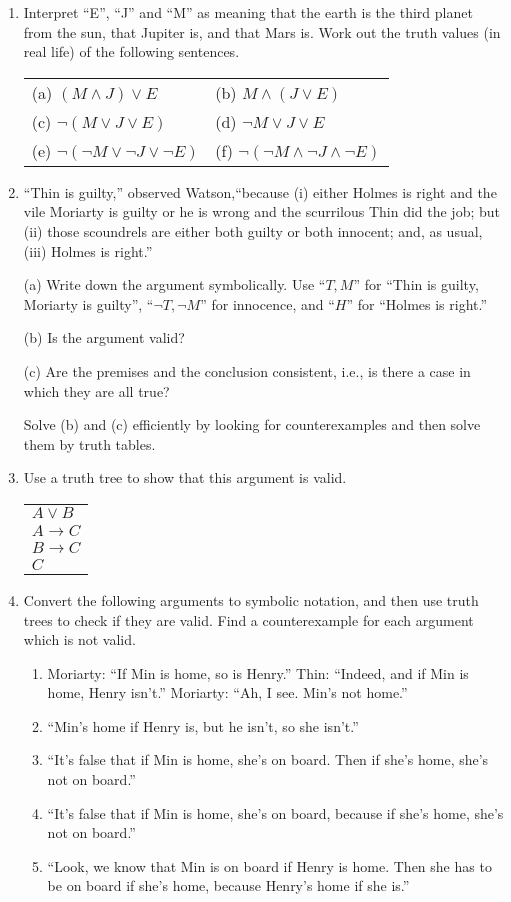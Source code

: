 \documentclass[letterpaper, 11pt]{article}
\theoremstyle{definition}
\begin{document}
\begin{enumerate}
 \item Interpret ``E'', ``J'' and ``M'' as meaning that the earth is the third planet from the sun, that Jupiter is, and that Mars is. Work out the truth values (in real life) of the following sentences.

\begin{tabular}{ll}
(a) $(M\wedge J) \vee E$	& (b) $M\wedge (J \vee E)$ \\
(c) $\neg(M \vee J \vee E)$	& (d) $\neg M \vee J \vee E$ \\
(e) $\neg(\neg M \vee \neg J \vee \neg E)$ & (f) $\neg(\neg M \wedge \neg J \wedge \neg E)$
\end{tabular}

\item ``Thin is guilty,'' observed Watson,``because (i) either Holmes is right and the vile Moriarty is guilty or he is wrong and the scurrilous Thin did the job; but (ii) those scoundrels are either both guilty or both innocent; and, as usual, (iii) Holmes is right.''

(a) Write down the argument symbolically. Use ``$T, M$'' for ``Thin is guilty, Moriarty is guilty'', ``$\neg T,\neg M$'' for innocence, and ``$H$'' for ``Holmes is right.''

(b) Is the argument valid? 
 
(c) Are the premises and the conclusion consistent, i.e., is there a case in which they are all true?

 Solve (b) and (c) efficiently by looking for counterexamples and then solve them by truth tables.

\item \parbox{3.5in}{Use a truth tree to show that this argument is valid.}\quad
\begin{tabular}{l}
$A\vee B$\\
$A\to C$\\
$B\to C$\\\hline
$C$
\end{tabular}

\item Convert the following arguments to symbolic notation, and then use truth trees to check if they are valid. Find a counterexample for each argument which is not valid.
\begin{enumerate}
\item Moriarty: ``If Min is home, so is Henry.'' Thin: ``Indeed, and if Min is home, Henry isn't.'' Moriarty: ``Ah, I see. Min's not home.''
\item ``Min's home if Henry is, but he isn't, so she isn't.''
\item ``It's false that if Min is home, she's on board. Then if she's home, she's not on board.''
\item ``It's false that if Min is home, she's on board, because if she's home, she's not on board.''
\item ``Look, we know that Min is on board if Henry is home. Then she has to be on board if she's home, because Henry's home if she is.''
\end{enumerate}

\end{enumerate}
\end{document}

